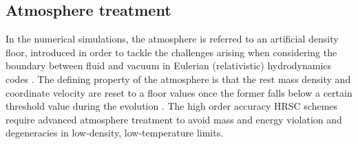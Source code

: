 

\subsection{Atmosphere treatment}

In the numerical simulations, the atmosphere is referred to an artificial 
density floor, introduced in order to tackle the challenges arising when considering the  boundary between fluid and vacuum in Eulerian (relativistic) hydrodynamics codes
\citep{Galeazzi:mThesis:2008,Kastaun:2006,Millmore:2009dk,Radice:2013apa,Radice:2015nva}.
%
The defining property of the atmosphere is that the rest mass density and coordinate velocity are reset to a floor values once the former falls below a certain threshold value during the evolution \citep{Font:2001ew,Baiotti:2004wn}.
%
The high order accuracy \ac{HRSC} schemes require advanced atmosphere treatment to avoid 
mass and energy violation \cite{Radice:2011qr} and
degeneracies in low-density, low-temperature limits.

